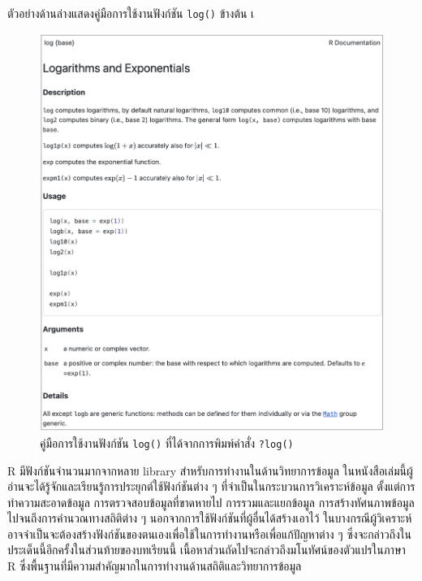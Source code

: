 \documentclass[
  a4paper,
]{book}
\begin{document}
ตัวอย่างด้านล่างแสดงคู่มือการใช้งานฟังก์ชัน \texttt{log()} ข้างต้น เ

\begin{figure}

\begin{minipage}{\linewidth}

\includegraphics{img/02loghelp.png}

\end{minipage}%

\caption{\label{fig-Help}คู่มือการใช้งานฟังก์ชัน \texttt{log()}
ที่ได้จากการพิมพ์คำสั่ง \texttt{?log()}}

\end{figure}%

R มีฟังก์ชันจำนวนมากจากหลาย library สำหรับการทำงานในด้านวิทยาการข้อมูล
ในหนังสือเล่มนี้ผู้อ่านจะได้รู้จักและเรียนรู้การประยุกต์ใช้ฟังก์ชันต่าง ๆ
ที่จำเป็นในกระบวนการวิเคราะห์ข้อมูล ตั้งแต่การทำความสะอาดข้อมูล
การตรวจสอบข้อมูลที่ขาดหายไป การรวมและแยกข้อมูล การสร้างทัศนภาพข้อมูล
ไปจนถึงการคำนวณทางสถิติต่าง ๆ นอกจากการใช้ฟังก์ชันที่ผู้อื่นได้สร้างเอาไว้
ในบางกรณีผู้วิเคราะห์อาจจำเป็นจะต้องสร้างฟังก์ชันของตนเองเพื่อใช้ในการทำงานหรือเพื่อแก้ปัญหาต่าง
ๆ ซึ่งจะกล่าวถึงในประเด็นนี้อีกครั้งในส่วนท้ายของบทเรียนนี้
เนื้อหาส่วนถัดไปจะกล่าวถึงมโนทัศน์ของตัวแปรในภาษา R
ซึ่งพื้นฐานที่มีความสำคัญมากในการทำงานด้านสถิติและวิทยาการข้อมูล
\end{document}
